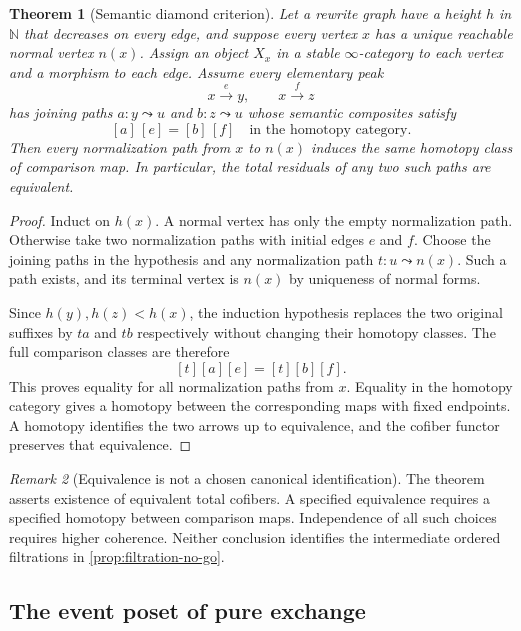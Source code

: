 \documentclass[11pt]{article}
\newtheorem{theorem}{Theorem}[section]
\theoremstyle{definition}
\theoremstyle{remark}
\newtheorem{remark}[theorem]{Remark}
\begin{document}
\begin{theorem}[Semantic diamond criterion]\label{thm:semantic-diamond}
Let a rewrite graph have a height $h$ in $\mathbb N$ that decreases on every edge, and suppose every vertex $x$ has a unique reachable normal vertex $n(x)$. Assign an object $X_x$ in a stable $\infty$-category to each vertex and a morphism to each edge. Assume every elementary peak
\[
x\xrightarrow{e}y,\qquad x\xrightarrow{f}z
\]
has joining paths $a:y\leadsto u$ and $b:z\leadsto u$ whose semantic composites satisfy
\[
[a]\,[e]=[b]\,[f]\quad\text{in the homotopy category}.
\]
Then every normalization path from $x$ to $n(x)$ induces the same homotopy class of comparison map. In particular, the total residuals of any two such paths are equivalent.
\end{theorem}

\begin{proof}
Induct on $h(x)$. A normal vertex has only the empty normalization path. Otherwise take two normalization paths with initial edges $e$ and $f$. Choose the joining paths in the hypothesis and any normalization path $t:u\leadsto n(x)$. Such a path exists, and its terminal vertex is $n(x)$ by uniqueness of normal forms.

Since $h(y),h(z)<h(x)$, the induction hypothesis replaces the two original suffixes by $ta$ and $tb$ respectively without changing their homotopy classes. The full comparison classes are therefore
\[
[t][a][e]=[t][b][f].
\]
This proves equality for all normalization paths from $x$. Equality in the homotopy category gives a homotopy between the corresponding maps with fixed endpoints. A homotopy identifies the two arrows up to equivalence, and the cofiber functor preserves that equivalence.
\end{proof}

\begin{remark}[Equivalence is not a chosen canonical identification]
The theorem asserts existence of equivalent total cofibers. A specified equivalence requires a specified homotopy between comparison maps. Independence of all such choices requires higher coherence. Neither conclusion identifies the intermediate ordered filtrations in \cref{prop:filtration-no-go}.
\end{remark}

\subsection{The event poset of pure exchange}
\end{document}
